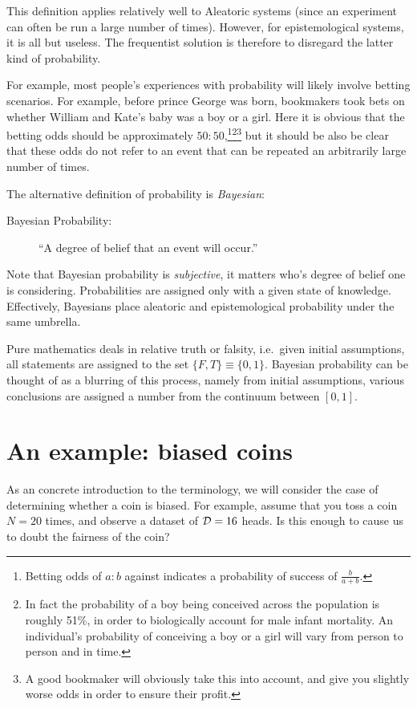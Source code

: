 This definition applies relatively well to Aleatoric systems (since an experiment can often be run a large number of times). However, for epistemological systems, it is all but useless. The frequentist solution is therefore to disregard the latter kind of probability.

For example, most people's experiences with probability will likely involve betting scenarios. For example, before prince George was born, bookmakers took bets on whether William and Kate's baby was a boy or a girl. Here it is obvious that the betting odds should be approximately \(50:50\),\footnote{Betting odds of \(a:b\) against indicates a probability of success of \(\frac{b}{a+b}\).}\footnote{In fact the probability of a boy being conceived across the population is roughly 51\%, in order to biologically account for male infant mortality. An individual's probability of conceiving a boy or a girl will vary from person to person and in time.}\footnote{A good bookmaker will obviously take this into account, and give you slightly worse odds in order to ensure their profit.} but it should be also be clear that these odds do not refer to an event that can be repeated an arbitrarily large number of times.

The alternative definition of probability is {\em Bayesian\/}:
\begin{description}
  \item[Bayesian Probability:] ``A degree of belief that an event will occur.'' 
\end{description}
Note that Bayesian probability is {\em subjective}, it matters who's degree of belief one is considering. Probabilities are assigned only with a given state of knowledge. Effectively, Bayesians place aleatoric and epistemological probability under the same umbrella. 

Pure mathematics deals in relative truth or falsity, i.e.\ given initial assumptions, all statements are assigned to the set \(\{F,T\}\equiv\{0,1\}\). Bayesian probability can be thought of as a blurring of this process, namely from initial assumptions, various conclusions are assigned a number from the continuum between \([0,1]\).

\section{An example: biased coins}
As an concrete introduction to the terminology, we will consider the case of determining whether a coin is biased.
For example, assume that you toss a coin \(N=20\) times, and observe a dataset of \(\mathcal{D} = 16\) heads. Is this enough to cause us to doubt the fairness of the coin?

